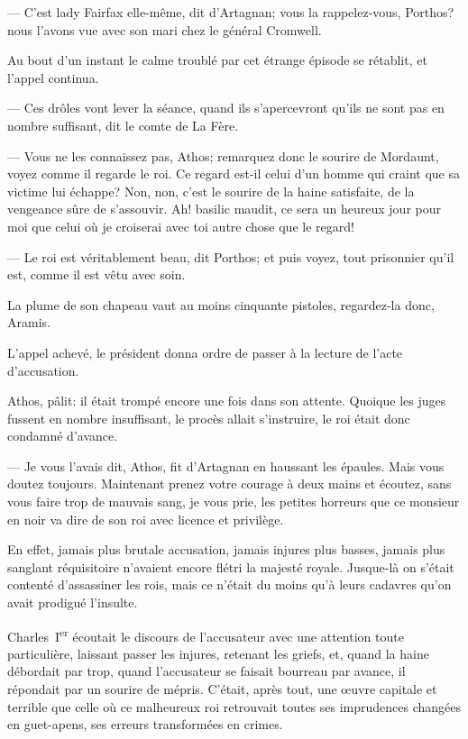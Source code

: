 — C'est lady Fairfax elle-même, dit d'Artagnan; vous la rappelez-vous, Porthos? nous l'avons vue avec son mari chez le général Cromwell.

Au bout d'un instant le calme troublé par cet étrange épisode se rétablit, et l'appel continua.

— Ces drôles vont lever la séance, quand ils s'apercevront qu'ils ne sont pas en nombre suffisant, dit le comte de La Fère.

— Vous ne les connaissez pas, Athos; remarquez donc le sourire de Mordaunt, voyez comme il regarde le roi. Ce regard est-il celui d'un homme qui craint que sa victime lui échappe? Non, non, c'est le sourire de la haine satisfaite, de la vengeance sûre de s'assouvir. Ah! basilic maudit, ce sera un heureux jour pour moi que celui où je croiserai avec toi autre chose que le regard!

— Le roi est véritablement beau, dit Porthos; et puis voyez, tout prisonnier qu'il est, comme il est vêtu avec soin.

La plume de son chapeau vaut au moins cinquante pistoles, regardez-la donc, Aramis.

L'appel achevé, le président donna ordre de passer à la lecture de l'acte d'accusation.

Athos, pâlit: il était trompé encore une fois dans son attente. Quoique les juges fussent en nombre insuffisant, le procès allait s'instruire, le roi était donc condamné d'avance.

— Je vous l'avais dit, Athos, fit d'Artagnan en haussant les épaules. Mais vous doutez toujours. Maintenant prenez votre courage à deux mains et écoutez, sans vous faire trop de mauvais sang, je vous prie, les petites horreurs que ce monsieur en noir va dire de son roi avec licence et privilège.

En effet, jamais plus brutale accusation, jamais injures plus basses, jamais plus sanglant réquisitoire n'avaient encore flétri la majesté royale. Jusque-là on s'était contenté d'assassiner les rois, mais ce n'était du moins qu'à leurs cadavres qu'on avait prodigué l'insulte.

Charles~I\textsuperscript{er} écoutait le discours de l'accusateur avec une attention toute particulière, laissant passer les injures, retenant les griefs, et, quand la haine débordait par trop, quand l'accusateur se faisait bourreau par avance, il répondait par un sourire de mépris. C'était, après tout, une œuvre capitale et terrible que celle où ce malheureux roi retrouvait toutes ses imprudences changées en guet-apens, ses erreurs transformées en crimes.

